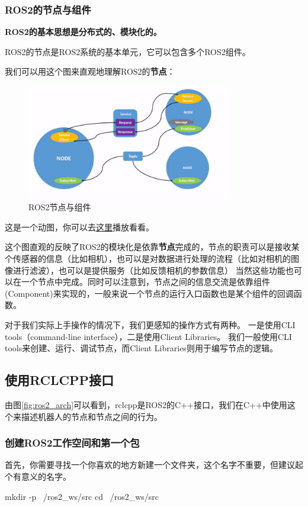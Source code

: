 \subsubsection{ROS2的节点与组件}
\textbf{ROS2的基本思想是分布式的、模块化的。}

ROS2的节点是ROS2系统的基本单元，它可以包含多个ROS2组件。

我们可以用这个图来直观地理解ROS2的\textbf{节点}：
\begin{figure}[h]
    \centering
    \includegraphics[width=0.8\textwidth]{Chapter4/img/ros2_node.png}
    \caption{ROS2节点与组件}
    \label{fig:ros2_node}
\end{figure}
这是一个动图，你可以去\underline{\href{https://docs.ros.org/en/humble/_images/Nodes-TopicandService.gif}{这里}}播放看看。

这个图直观的反映了ROS2的模块化是依靠\textbf{节点}完成的，节点的职责可以是接收某个传感器的信息（比如相机），也可以是对数据进行处理的流程（比如对相机的图像进行滤波），也可以是提供服务（比如反馈相机的参数信息）
当然这些功能也可以在一个节点中完成。同时可以注意到，节点之间的信息交流是依靠组件(Component)来实现的，一般来说一个节点的运行入口函数也是某个组件的回调函数。


对于我们实际上手操作的情况下，我们更感知的操作方式有两种。
一是使用CLI tools（command-line interface），二是使用Client Libraries。
我们一般使用CLI tools来创建、运行、调试节点，而Client Libraries则用于编写节点的逻辑。

\subsection{使用RCLCPP接口}
由图\ref{fig:ros2_arch}可以看到，rclcpp是ROS2的C++接口，我们在C++中使用这个来描述机器人的节点和节点之间的行为。
\subsubsection{创建ROS2工作空间和第一个包}
首先，你需要寻找一个你喜欢的地方新建一个文件夹，这个名字不重要，但建议起个有意义的名字。
\begin{tbash}
    mkdir -p ~/ros2_ws/src
    cd ~/ros2_ws/src
\end{tbash}

